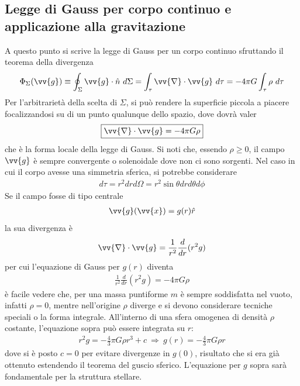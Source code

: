 \documentclass[a4paper, oneside]{book}
\begin{document}
\subsection{Legge di Gauss per corpo continuo e applicazione alla gravitazione}
A questo punto si scrive la legge di Gauss per un corpo continuo sfruttando il teorema della divergenza
\begin{gather*}
    \Phi_\Sigma(\vv{g} ) \equiv \oint _\Sigma \vv{g} \cdot \hat{n} \ d\Sigma = \int_{\tau} \vv{\nabla} \cdot \vv{g} \ d\tau = -4\pi G\int_{\tau} \rho \ d\tau       
\end{gather*}
Per l'arbitrarietà della scelta di $\Sigma$, si può rendere la superficie 
piccola a piacere focalizzandosi su di un punto qualunque dello spazio,
dove dovrà valer
\begin{align}
    \boxed{\vv{\nabla} \cdot \vv{g} = -4\pi G \rho   }
\end{align}
che è la forma locale della legge di Gauss. Si noti che, essendo $\rho \geq 0$, il campo
$\vv{g}$ è sempre convergente o solenoidale dove non ci sono sorgenti. Nel caso in cui il 
corpo avesse una simmetria sferica, si potrebbe considerare
\begin{gather*}
    d\tau = r^{2}dr d\Omega = r^{2}\sin\theta dr d\theta d\phi 
\end{gather*} 
Se il campo fosse di tipo centrale 
\begin{gather*}
    \vv{g}(\vv{x} ) = g(r)\hat{r}  
\end{gather*}
la sua divergenza è
\begin{gather*}
    \vv{\nabla} \cdot \vv{g} = \frac{1}{r^{2}} \frac{d}{dr}(r^{2}g)   
\end{gather*}
per cui l'equazione di Gauss per $g(r)$ diventa 
\begin{align}
    \boxed{\frac{1}{r^{2}}\frac{d}{dr}(r^{2}g) = -4\pi G \rho}
\end{align}
è facile vedere che, per una massa puntiforme $m$ è sempre soddisfatta nel vuoto, 
infatti $\rho = 0 $, mentre nell'origine $\rho$ diverge e si devono considerare
tecniche speciali o la forma integrale. All'interno di una sfera omogenea di densità
$\rho$ costante, l'equazione sopra può essere integrata su $r$:
\begin{gather*}
    r^{2} g = -\frac{4}{3}\pi G \rho r ^{3} + c \ \Longrightarrow \ g(r) = - \frac{4}{3}\pi G \rho r
\end{gather*}
dove si è posto $c = 0$ per evitare divergenze in $g(0)$, 
risultato che si era già ottenuto estendendo il teorema del guscio sferico.
L'equazione per $g$ sopra sarà fondamentale per la struttura stellare.
\end{document}
